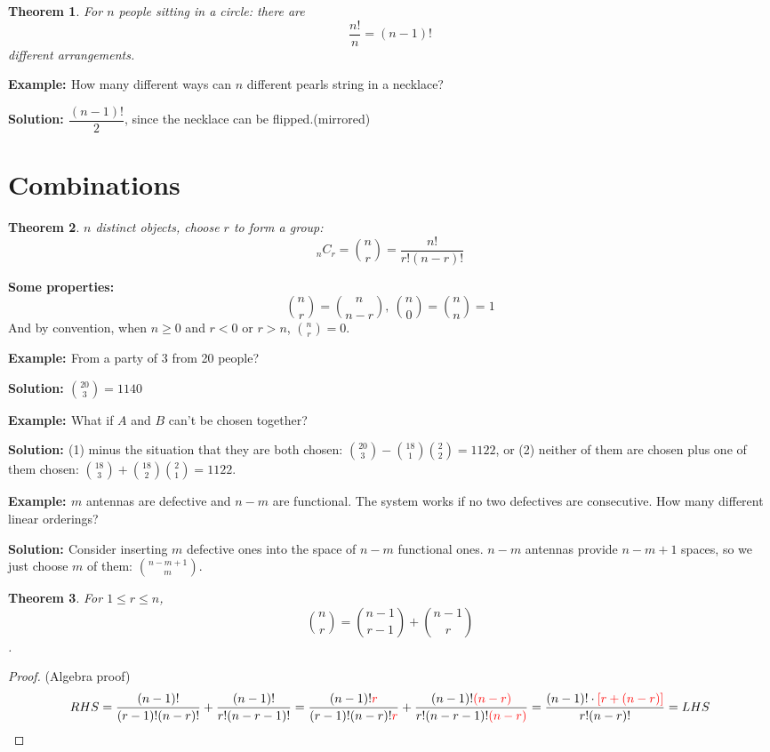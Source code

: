 \documentclass[11pt, a4paper]{MATH2421}
\newtheorem*{theorem}{Theorem}
\newcommand{\eg}{{\bf {Example: }}}
\newcommand{\sol}{{\bf {Solution: }}}
\begin{document}
\begin{spacing}{1.3}
    \begin{theorem}
        For $n$ people sitting in a circle: there are 
        $$\frac{n!}{n}=(n-1)!$$
        different arrangements.
    \end{theorem}

    \eg How many different ways can $n$ different pearls 
    string in a necklace?

    \sol $\dfrac{(n-1)!}{2}$, since the necklace can be 
    flipped.(mirrored)

    \section{Combinations}

    \begin{theorem}
        $n$ distinct objects, choose $r$ to form a group:
        $$_nC_r={n\choose r}=\frac{n!}{r!(n-r)!}$$
    \end{theorem}

    {\bf Some properties:}
    $${n\choose r}={n\choose n-r},\ 
    {n\choose 0}={n\choose n}=1$$
    And by convention, when $n\ge 0$ and 
    $r<0$ or $r>n$, ${n\choose r}=0$.

    \eg From a party of 3 from 20 people?

    \sol ${20\choose 3}=1140$

    \eg What if $A$ and $B$ can't be chosen together?

    \sol (1) minus the situation that they are both chosen: 
    ${20\choose 3}-{18\choose 1}{2\choose 2}=1122$,
    or (2) neither of them are chosen plus one of them chosen: 
    ${18\choose 3}+{18\choose 2}{2\choose 1}=1122$.

    \eg $m$ antennas are defective and $n-m$ are functional.
    The system works if no two defectives are consecutive.
    How many different linear orderings?

    \sol Consider inserting $m$ defective ones into 
    the space of $n-m$ functional ones. 
    $n-m$ antennas provide $n-m+1$ spaces, 
    so we just choose $m$ of them: ${n-m+1\choose m}$.

    \begin{theorem}
        For $1\le r\le n$, 
        $${n\choose r}={n-1\choose r-1}+{n-1\choose r}$$.
    \end{theorem}

    \begin{proof}
        (Algebra proof) 
        $$RHS=\frac{(n-1)!}{(r-1)!(n-r)!}+
        \frac{(n-1)!}{r!(n-r-1)!}
        =\frac{(n-1)!{\color{red}{r}}}{(r-1)!(n-r)!{\color{red}{r}}}+
        \frac{(n-1)!{\color{red}{(n-r)}}}{r!(n-r-1)!{\color{red}{(n-r)}}}
        =\frac{(n-1)!\cdot \color{red}{[r+(n-r)]}}{r!(n-r)!}=LHS$$


\end{proof}
\end{spacing}
\end{document}
